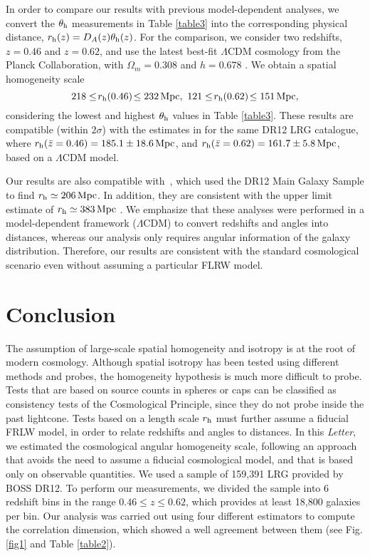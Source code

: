 \documentclass[useAMS,usenatbib]{mn2e}
\def \be {\begin{equation}}
\def \ee {\end{equation}}
\begin{document}
In order to compare our results with previous model-dependent analyses, we convert the $\theta_{\rm h}$ measurements in Table \ref{table3} into the corresponding physical distance, $r_{\rm h}(z) = D_A(z) \theta_{\rm h}(z)$. For the comparison, we consider two redshifts, $z = 0.46$ and $z = 0.62$, and use the latest best-fit $\Lambda$CDM cosmology from the Planck Collaboration, with $\Omega_m=0.308$ and $h=0.678$ \citep{planck16}. We obtain a spatial homogeneity scale 
\be\label{rh} 
218 \leq\! r_{\rm h}(0.46)\! \leq 232\, \mathrm{Mpc} ,~121 \leq \!r_{\rm h}(0.62)\! \leq 151\, \mathrm{Mpc} ,
\ee 
considering the lowest and highest $\theta_{\rm h}$ values in Table \ref{table3}. These results are compatible (within $2\sigma$) with the estimates in \cite{ntelis17} for the same DR12 LRG catalogue, where $r_{\rm h}(\bar{z} = 0.46) = 185.1 \pm 18.6 \, \mathrm{Mpc}$, and $r_{\rm h}(\bar{z} = 0.62) = 161.7 \pm 5.8 \, \mathrm{Mpc}$, based on a $\Lambda$CDM model.

Our results are also compatible with~\cite{pandey15}, which used the DR12 Main Galaxy Sample to find $r_{\rm h} \simeq 206 \, \mathrm{Mpc}$. In addition, they are consistent with the upper limit estimate of $r_{\rm h} \simeq 383 \, \mathrm{Mpc}$ \citep{yadav10}. We emphasize that these analyses were performed in a model-dependent framework ($\Lambda$CDM) to convert redshifts and angles into distances, whereas our analysis only requires angular information of the galaxy distribution. Therefore, our results are consistent with the standard cosmological scenario even without assuming a particular FLRW model.


\section{Conclusion}

The assumption of large-scale spatial homogeneity and isotropy is at the root of modern cosmology. Although spatial isotropy has been tested using different methods and probes, the homogeneity hypothesis is much more difficult to probe. Tests that are based on source counts in spheres or caps can be classified as consistency tests of the Cosmological Principle, since they do not probe inside the past lightcone. Tests based on a length scale $r_{\rm h}$ must further assume a fiducial FRLW model, in order to relate redshifts and angles to distances. In this {\it Letter}, we estimated the cosmological angular homogeneity scale, following an approach that avoids the need to assume a fiducial cosmological model, and that is based only on observable quantities. We used a sample of 159,391 LRG provided by BOSS DR12. To perform our measurements, we  divided the sample into 6 redshift bins in the range $0.46\leq z\leq 0.62$, which provides at least 18,800 galaxies per bin. Our analysis was carried out using four different estimators to compute the correlation dimension, which showed a well agreement between them (see Fig. \ref{fig1} and Table \ref{table2}). 
\end{document}
